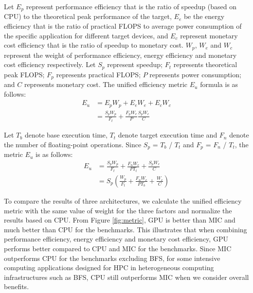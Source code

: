 Let $E_{p}$ represent performance efficiency that is the ratio of speedup (based on CPU) to the theoretical peak performance of the target, $E_{e}$ be the energy efficiency that is the ratio of practical FLOPS to average power consumption of the specific application for different target devices, and $E_{c}$ represent monetary cost efficiency that is the ratio of speedup to monetary cost. $W_{p}$, $W_{e}$ and $W_{c}$ represent the weight of performance efficiency, energy efficiency and monetary cost efficiency respectively. Let $S_{p}$ represent speedup; $F_{t}$ represents theoretical peak FLOPS; $F_{p}$ represents practical FLOPS; $P$ represents power consumption; and $C$ represents monetary cost. The unified efficiency metric $E_{u}$ formula is as follows:
  \begin{equation}\label{equ:metric1}
    \begin{split}
  {E_{u}} &  = E_{p}W_{p}+E_{e}W_{e}+E_{c}W_{c} \\
   & = \frac{S_{p}W_{p}}{F_{t}}+\frac{F_{p}W_{e}}{P}\frac{S_{p}W_{c}}{C}
  \end{split}
\end{equation}
  
Let $T_{b}$ denote base execution time, $T_{t}$ denote target execution time and $F_{n}$ denote the number of floating-point operations. Since $S_{p}$ = $T_{b}$ / $T_{t}$ and $F_{p}$ = $F_{n}$ / $T_{t}$, the metric $E_{u}$ is as follows:
  \begin{equation}\label{equ:metric1}
    \begin{split}
  {E_{u}} &  = \frac{S_{p}W_{p}}{F_{t}}+\frac{F_{n}W_{e}}{PT_{t}}+\frac{S_{p}W_{c}}{C} \\
   & = {S_{p}}(\frac{W_{p}}{F_{t}}+\frac{F_{n}W_{e}}{PT_{b}}+\frac{W_{c}}{C})
  \end{split}
\end{equation}

  
 To compare the results of three architectures, we calculate the unified efficiency metric with the same value of weight for the three factors and normalize the results based on CPU. From Figure \ref{fig:metric}, GPU is better than MIC and much better than CPU for the benchmarks. This illustrates that when combining performance efficiency, energy efficiency and monetary cost efficiency, GPU performs better compared to CPU and MIC for the benchmarks. Since MIC outperforms CPU for the benchmarks excluding BFS, for some intensive computing applications designed for HPC in heterogeneous computing infrastructures such as BFS, CPU still outperforms MIC when we consider overall benefits.


